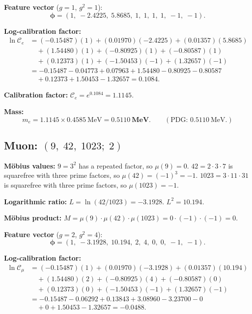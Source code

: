 \documentclass[11pt,a4paper]{article}
\begin{document}
\textbf{Feature vector} ($g=1$, $g^2=1$):
\[
  \boldsymbol{\phi} = (1,\; -2.4225,\; 5.8685,\; 1,\; 1,\; 1,\; 1,\; -1,\; -1).
\]

\textbf{Log-calibration factor:}
\begin{align*}
  \ln \mathcal{C}_e &= (-0.15487)(1) + (0.01970)(-2.4225) + (0.01357)(5.8685) \\
    &\quad + (1.54480)(1) + (-0.80925)(1) + (-0.80587)(1) \\
    &\quad + (0.12373)(1) + (-1.50453)(-1) + (1.32657)(-1) \\
    &= -0.15487 - 0.04773 + 0.07963 + 1.54480 - 0.80925 - 0.80587 \\
    &\quad + 0.12373 + 1.50453 - 1.32657 = \mathbf{0.1084}.
\end{align*}

\textbf{Calibration factor:} $\mathcal{C}_e = e^{0.1084} = \mathbf{1.1145}$.

\textbf{Mass:}
\[
  m_e = 1.1145 \times 0.4585~\text{MeV} = \mathbf{0.5110~\text{MeV}}.
  \qquad (\text{PDG: } 0.5110~\text{MeV}.)
\]

\subsection{Muon: $(9,\;42,\;1023;\;2)$}

\textbf{M\"{o}bius values:}
$9 = 3^2$ has a repeated factor, so $\mu(9) = 0$.
$42 = 2\cdot3\cdot7$ is squarefree with three prime factors, so $\mu(42) = (-1)^3 = -1$.
$1023 = 3\cdot11\cdot31$ is squarefree with three prime factors, so $\mu(1023) = -1$.

\textbf{Logarithmic ratio:}
$L = \ln(42/1023) = -3.1928$.  $L^2 = 10.194$.

\textbf{M\"{o}bius product:}
$M = \mu(9)\cdot\mu(42)\cdot\mu(1023) = 0\cdot(-1)\cdot(-1) = 0$.

\textbf{Feature vector} ($g=2$, $g^2=4$):
\[
  \boldsymbol{\phi} = (1,\; -3.1928,\; 10.194,\; 2,\; 4,\; 0,\; 0,\; -1,\; -1).
\]

\textbf{Log-calibration factor:}
\begin{align*}
  \ln \mathcal{C}_\mu &= (-0.15487)(1) + (0.01970)(-3.1928) + (0.01357)(10.194) \\
    &\quad + (1.54480)(2) + (-0.80925)(4) + (-0.80587)(0) \\
    &\quad + (0.12373)(0) + (-1.50453)(-1) + (1.32657)(-1) \\
    &= -0.15487 - 0.06292 + 0.13843 + 3.08960 - 3.23700 - 0 \\
    &\quad + 0 + 1.50453 - 1.32657 = \mathbf{-0.0488}.
\end{align*}
\end{document}
